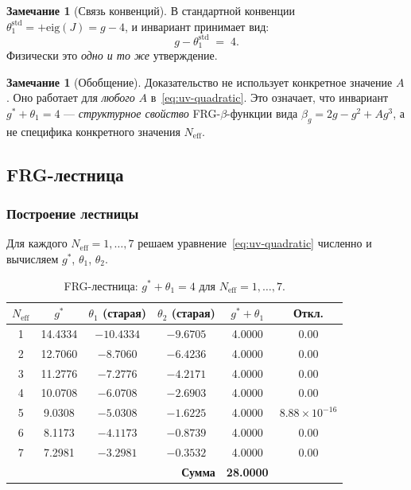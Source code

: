 \documentclass[11pt,a4paper]{article}
\theoremstyle{definition}
\newtheorem{remark}[theorem]{Замечание}
\begin{document}
\begin{remark}[Связь конвенций]
\label{rem:conventions}
В стандартной конвенции $\theta_1^{\text{std}} = +\mathrm{eig}(J) = g - 4$,
и инвариант принимает вид:
\begin{equation}
    g - \theta_1^{\text{std}} \;=\; 4.
\end{equation}
Физически это \emph{одно и то же} утверждение.
\end{remark}

\begin{remark}[Обобщение]
\label{rem:generalization}
Доказательство не использует конкретное значение $A$. Оно
работает для \emph{любого} $A$ в~\eqref{eq:uv-quadratic}.
Это означает, что инвариант $g^* + \theta_1 = 4$ ---
\emph{структурное свойство} FRG-$\beta$-функции вида
$\beta_g = 2g - g^2 + A g^3$, а не специфика конкретного
значения $N_{\text{eff}}$.
\end{remark}

\subsection{FRG-лестница}
\label{subsec:frg-ladder}

\subsubsection{Построение лестницы}

Для каждого $N_{\text{eff}} = 1, \ldots, 7$ решаем
уравнение~\eqref{eq:uv-quadratic} численно и вычисляем
$g^*$, $\theta_1$, $\theta_2$.

\begin{table}[ht]
\centering
\caption{FRG-лестница: $g^* + \theta_1 = 4$ для $N_{\text{eff}} = 1, \ldots, 7$.}
\label{tab:frg-ladder-main}
\begin{tabular}{cccccc}
\toprule
$N_{\text{eff}}$ & $g^*$ & $\theta_1$ (старая) & $\theta_2$ (старая)
& $g^* + \theta_1$ & Откл. \\
\midrule
1 & 14.4334 & $-10.4334$ & $-9.6705$ & 4.0000 & $0.00$ \\
2 & 12.7060 & $-8.7060$  & $-6.4236$ & 4.0000 & $0.00$ \\
3 & 11.2776 & $-7.2776$  & $-4.2171$ & 4.0000 & $0.00$ \\
4 & 10.0708 & $-6.0708$  & $-2.6903$ & 4.0000 & $0.00$ \\
5 & 9.0308  & $-5.0308$  & $-1.6225$ & 4.0000 & $8.88 \times 10^{-16}$ \\
6 & 8.1173  & $-4.1173$  & $-0.8739$ & 4.0000 & $0.00$ \\
7 & 7.2981  & $-3.2981$  & $-0.3532$ & 4.0000 & $0.00$ \\
\midrule
\multicolumn{4}{r}{\textbf{Сумма}} & \textbf{28.0000} & \\
\bottomrule
\end{tabular}
\end{table}
\end{document}
